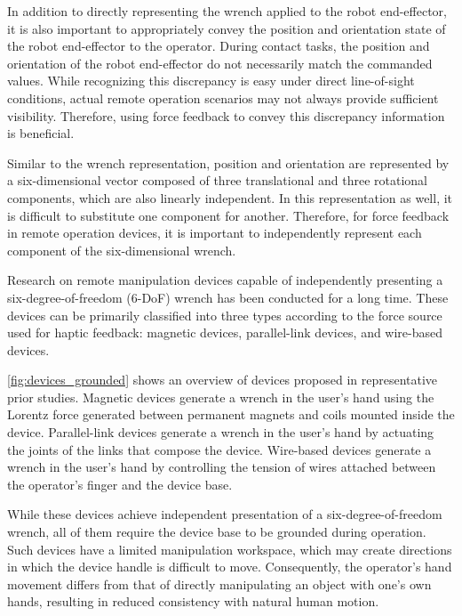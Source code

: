 \documentclass{WileyMSP-template}
\begin{document}
In addition to directly representing the wrench applied to the robot end-effector, it is also important to appropriately convey the position and orientation state of the robot end-effector to the operator.
During contact tasks, the position and orientation of the robot end-effector do not necessarily match the commanded values.
While recognizing this discrepancy is easy under direct line-of-sight conditions, actual remote operation scenarios may not always provide sufficient visibility.
Therefore, using force feedback to convey this discrepancy information is beneficial.

Similar to the wrench representation, position and orientation are represented by a six-dimensional vector composed of three translational and three rotational components, which are also linearly independent.
In this representation as well, it is difficult to substitute one component for another.
Therefore, for force feedback in remote operation devices, it is important to independently represent each component of the six-dimensional wrench.

Research on remote manipulation devices capable of independently presenting a six-degree-of-freedom (6-DoF) wrench has been conducted for a long time.
These devices can be primarily classified into three types according to the force source used for haptic feedback: magnetic devices, parallel-link devices, and wire-based devices.

\ref{fig:devices_grounded} shows an overview of devices proposed in representative prior studies.
Magnetic devices \cite{magnetic} generate a wrench in the user's hand using the Lorentz force generated between permanent magnets and coils mounted inside the device.
Parallel-link devices \cite{parallel_vulliez,parallel_qin} generate a wrench in the user's hand by actuating the joints of the links that compose the device.
Wire-based devices \cite{spidar_8} generate a wrench in the user's hand by controlling the tension of wires attached between the operator's finger and the device base.

While these devices achieve independent presentation of a six-degree-of-freedom wrench, all of them require the device base to be grounded during operation.
Such devices have a limited manipulation workspace, which may create directions in which the device handle is difficult to move.
Consequently, the operator's hand movement differs from that of directly manipulating an object with one's own hands, resulting in reduced consistency with natural human motion.
\end{document}
